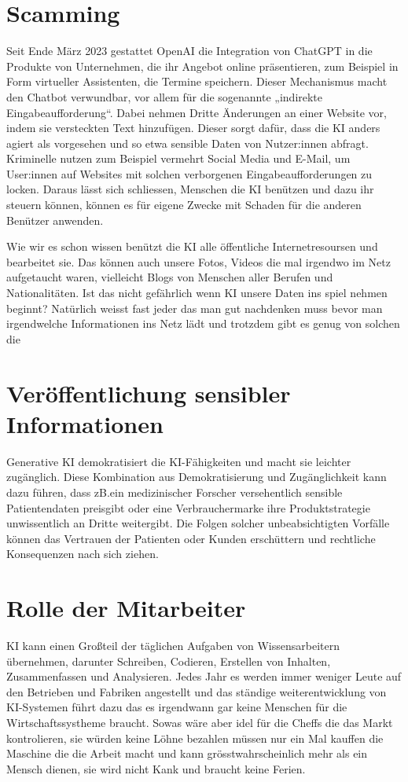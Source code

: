 \documentclass{report}
\begin{document}
 \section{Scamming}
 Seit Ende März 2023 gestattet OpenAI die Integration von ChatGPT in die Produkte von Unternehmen, 
 die ihr Angebot online präsentieren, zum Beispiel in Form virtueller Assistenten, die Termine speichern. 
 Dieser Mechanismus macht den Chatbot verwundbar, vor allem für die sogenannte „indirekte Eingabeaufforderung“.
 Dabei nehmen Dritte Änderungen an einer Website vor, indem sie versteckten Text hinzufügen. Dieser sorgt dafür,
dass die KI anders agiert als vorgesehen und so etwa sensible Daten von Nutzer:innen abfragt. Kriminelle nutzen 
zum Beispiel vermehrt Social Media und E-Mail, um User:innen auf Websites mit solchen verborgenen Eingabeaufforderungen zu locken.
Daraus lässt sich schliessen, Menschen die KI benützen und dazu ihr steuern können, können es für eigene Zwecke mit Schaden 
für die anderen Benützer anwenden. 

 Wie wir es schon wissen benützt die KI alle öffentliche Internetresoursen und bearbeitet sie. Das können auch unsere Fotos, Videos 
 die mal irgendwo im Netz aufgetaucht waren, vielleicht  Blogs von Menschen aller Berufen und Nationalitäten. 
Ist das nicht gefährlich wenn KI unsere Daten ins spiel nehmen beginnt? Natürlich weisst fast jeder das man gut nachdenken 
muss bevor man irgendwelche Informationen ins Netz lädt und trotzdem gibt es genug von solchen die 


\section{Veröffentlichung sensibler Informationen}
Generative KI demokratisiert die KI-Fähigkeiten und macht sie leichter zugänglich. 
Diese Kombination aus Demokratisierung und Zugänglichkeit kann dazu führen, dass zB.ein medizinischer 
Forscher versehentlich sensible Patientendaten preisgibt oder eine Verbrauchermarke ihre Produktstrategie
 unwissentlich an Dritte weitergibt. Die Folgen solcher unbeabsichtigten Vorfälle können das Vertrauen der 
 Patienten oder Kunden erschüttern und rechtliche Konsequenzen nach sich ziehen.

\section{Rolle der Mitarbeiter}
  KI kann einen Großteil der täglichen Aufgaben von Wissensarbeitern übernehmen, darunter Schreiben,
   Codieren, Erstellen von Inhalten, Zusammenfassen und Analysieren.  Jedes Jahr es werden immer weniger Leute auf den
   Betrieben und Fabriken angestellt und das ständige weiterentwicklung von KI-Systemen führt dazu das es irgendwann gar keine Menschen
 für die Wirtschaftssystheme braucht. Sowas wäre aber idel für die Cheffs die das Markt kontrolieren, sie würden keine Löhne bezahlen müssen 
 nur ein Mal kauffen die Maschine die die Arbeit macht und kann grösstwahrscheinlich mehr als ein Mensch dienen, sie wird nicht Kank und braucht keine 
 Ferien. 
\end{document}
